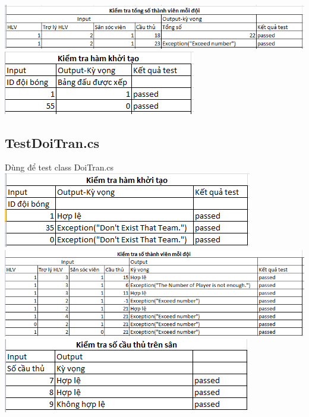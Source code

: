 \documentclass[a4paper]{article}
\begin{document}
\includegraphics[scale=0.5]{hinh10.png}\\

\includegraphics[scale=0.8]{hinh8.png}\\

\subsection{TestDoiTran.cs}
Dùng để test class DoiTran.cs\\

\includegraphics[scale=0.8]{hinh11.png}  \\ 

\includegraphics[scale=0.5]{hinh13.png}\\

\includegraphics[scale=0.8]{hinh12.png}\\
\end{document}
